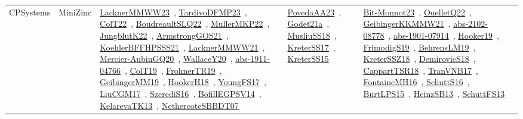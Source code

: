 {\begin{longtable}{lp{3cm}>{\raggedright\arraybackslash}p{6cm}>{\raggedright\arraybackslash}p{6cm}>{\raggedright\arraybackslash}p{8cm}}
CPSystems & MiniZinc & \href{works/LacknerMMWW23.pdf}{LacknerMMWW23}~\cite{LacknerMMWW23}, \href{works/TardivoDFMP23.pdf}{TardivoDFMP23}~\cite{TardivoDFMP23}, \href{works/ColT22.pdf}{ColT22}~\cite{ColT22}, \href{works/BoudreaultSLQ22.pdf}{BoudreaultSLQ22}~\cite{BoudreaultSLQ22}, \href{works/MullerMKP22.pdf}{MullerMKP22}~\cite{MullerMKP22}, \href{works/JungblutK22.pdf}{JungblutK22}~\cite{JungblutK22}, \href{works/ArmstrongGOS21.pdf}{ArmstrongGOS21}~\cite{ArmstrongGOS21}, \href{works/KoehlerBFFHPSSS21.pdf}{KoehlerBFFHPSSS21}~\cite{KoehlerBFFHPSSS21}, \href{works/LacknerMMWW21.pdf}{LacknerMMWW21}~\cite{LacknerMMWW21}, \href{works/Mercier-AubinGQ20.pdf}{Mercier-AubinGQ20}~\cite{Mercier-AubinGQ20}, \href{works/WallaceY20.pdf}{WallaceY20}~\cite{WallaceY20}, \href{works/abs-1911-04766.pdf}{abs-1911-04766}~\cite{abs-1911-04766}, \href{works/ColT19.pdf}{ColT19}~\cite{ColT19}, \href{works/FrohnerTR19.pdf}{FrohnerTR19}~\cite{FrohnerTR19}, \href{works/GeibingerMM19.pdf}{GeibingerMM19}~\cite{GeibingerMM19}, \href{works/HookerH18.pdf}{HookerH18}~\cite{HookerH18}, \href{works/YoungFS17.pdf}{YoungFS17}~\cite{YoungFS17}, \href{works/LiuCGM17.pdf}{LiuCGM17}~\cite{LiuCGM17}, \href{works/SzerediS16.pdf}{SzerediS16}~\cite{SzerediS16}, \href{works/BofillEGPSV14.pdf}{BofillEGPSV14}~\cite{BofillEGPSV14}, \href{works/KelarevaTK13.pdf}{KelarevaTK13}~\cite{KelarevaTK13}, \href{works/NethercoteSBBDT07.pdf}{NethercoteSBBDT07}~\cite{NethercoteSBBDT07} & \href{works/PovedaAA23.pdf}{PovedaAA23}~\cite{PovedaAA23}, \href{works/Godet21a.pdf}{Godet21a}~\cite{Godet21a}, \href{works/MusliuSS18.pdf}{MusliuSS18}~\cite{MusliuSS18}, \href{works/KreterSS17.pdf}{KreterSS17}~\cite{KreterSS17}, \href{works/KreterSS15.pdf}{KreterSS15}~\cite{KreterSS15} & \href{works/Bit-Monnot23.pdf}{Bit-Monnot23}~\cite{Bit-Monnot23}, \href{works/OuelletQ22.pdf}{OuelletQ22}~\cite{OuelletQ22}, \href{works/GeibingerKKMMW21.pdf}{GeibingerKKMMW21}~\cite{GeibingerKKMMW21}, \href{works/abs-2102-08778.pdf}{abs-2102-08778}~\cite{abs-2102-08778}, \href{works/abs-1901-07914.pdf}{abs-1901-07914}~\cite{abs-1901-07914}, \href{works/Hooker19.pdf}{Hooker19}~\cite{Hooker19}, \href{works/FrimodigS19.pdf}{FrimodigS19}~\cite{FrimodigS19}, \href{works/BehrensLM19.pdf}{BehrensLM19}~\cite{BehrensLM19}, \href{works/KreterSSZ18.pdf}{KreterSSZ18}~\cite{KreterSSZ18}, \href{works/DemirovicS18.pdf}{DemirovicS18}~\cite{DemirovicS18}, \href{works/CappartTSR18.pdf}{CappartTSR18}~\cite{CappartTSR18}, \href{works/TranVNB17.pdf}{TranVNB17}~\cite{TranVNB17}, \href{works/FontaineMH16.pdf}{FontaineMH16}~\cite{FontaineMH16}, \href{works/SchuttS16.pdf}{SchuttS16}~\cite{SchuttS16}, \href{works/BurtLPS15.pdf}{BurtLPS15}~\cite{BurtLPS15}, \href{works/HeinzSB13.pdf}{HeinzSB13}~\cite{HeinzSB13}, \href{works/SchuttFS13.pdf}{SchuttFS13}~\cite{SchuttFS13}\\

\end{longtable}}
